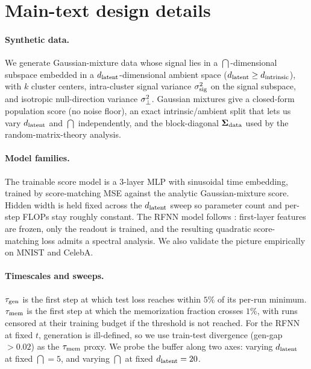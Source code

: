\section{Main-text design details}
\label{app:main-design-details}

\paragraph{Synthetic data.}
We generate Gaussian-mixture data whose signal lies in a
$\dint$-dimensional subspace embedded in a $d_{\mathrm{latent}}$-dimensional
ambient space ($d_{\mathrm{latent}} \geq d_{\mathrm{intrinsic}}$), with $k$ cluster centers,
intra-cluster signal variance $\sigma_{\mathrm{sig}}^2$ on the signal subspace,
and isotropic null-direction variance $\sigma_{\perp}^2$. Gaussian
mixtures give a closed-form population score (no noise floor),
an exact intrinsic/ambient split that lets us vary $d_{\mathrm{latent}}$ and
$\dint$ independently, and the block-diagonal $\bm{\Sigma}_{\mathrm{data}}$ used by
the random-matrix-theory analysis.

\paragraph{Model families.}
The trainable score model is a 3-layer MLP with sinusoidal time
embedding, trained by score-matching MSE against the analytic
Gaussian-mixture score. Hidden width is held fixed across the
$d_{\mathrm{latent}}$ sweep so parameter count and per-step FLOPs stay roughly
constant. The RFNN model follows \citet{bonnaire2025}: first-layer
features are frozen, only the readout is trained, and the resulting
quadratic score-matching loss admits a spectral analysis. We also
validate the picture empirically on MNIST and CelebA.

\paragraph{Timescales and sweeps.}
$\tau_{\mathrm{gen}}$ is the first step at which test loss reaches within
$5\%$ of its per-run minimum. $\tau_{\mathrm{mem}}$ is the first step at which
the \citet{somepalli2023diffusion} memorization fraction crosses
$1\%$, with runs censored at their training budget if the threshold
is not reached. For the RFNN at fixed $t$, generation is ill-defined,
so we use train-test divergence (gen-gap $>0.02$) as the
$\tau_{\mathrm{mem}}$ proxy. We probe the buffer along two axes: varying
$d_{\mathrm{latent}}$ at fixed $\dint=5$, and varying $\dint$ at fixed
$d_{\mathrm{latent}}=20$.

